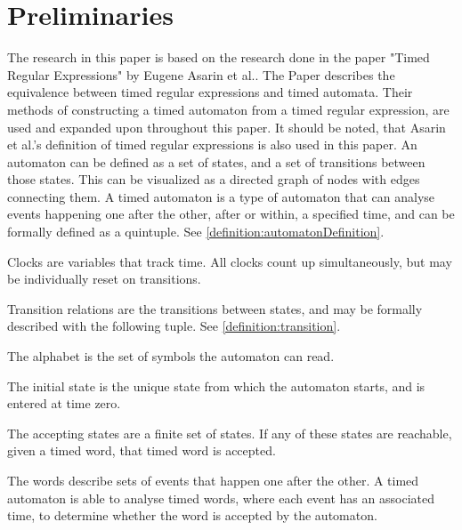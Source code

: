 \section{Preliminaries}\label{sec:preliminaries}






The research in this paper is based on the research done in the paper "Timed Regular Expressions" by Eugene Asarin et al.\cite{Eugene2001}. The Paper describes the equivalence between timed regular expressions and timed automata. Their methods of constructing a timed automaton from a timed regular expression, are used and expanded upon throughout this paper. It should be noted, that Asarin et al.'s definition of timed regular expressions is also used in this paper.
An automaton can be defined as a set of states, and a set of transitions between those states. This can be visualized as a directed graph of nodes with edges connecting them.
A timed automaton is a type of automaton that can analyse events happening one after the other, after or within, a specified time, and can be formally defined as a quintuple\cite{ALUR1994}. See \cref{definition:automatonDefinition}.


Clocks are variables that track time. All clocks count up simultaneously, but may be individually reset on transitions.

Transition relations are the transitions between states, and may be formally described with the following tuple. See \cref{definition:transition}.


The alphabet is the set of symbols the automaton can read.

The initial state is the unique state from which the automaton starts, and is entered at time zero.

The accepting states are a finite set of states. If any of these states are reachable, given a timed word, that timed word is accepted.

The words describe sets of events that happen one after the other. A timed automaton is able to analyse timed words, where each event has an associated time, to determine whether the word is accepted by the automaton.
